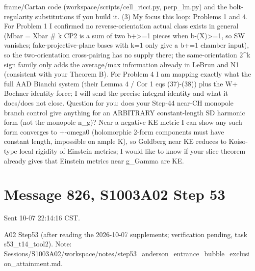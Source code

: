 \documentclass[
  10pt,
]{report}
\begin{document}
frame/Cartan code (workspace/scripts/cell\_ricci.py, perp\_lm.py) and
the bolt-regularity substitutions if you build it. (3) My focus this
loop: Problems 1 and 4. For Problem 1 I confirmed no reverse-orientation
actual class exists in general (Mbar = Xbar \# k CP2 is a sum of two
b+\textgreater=1 pieces when b-(X)\textgreater=1, so SW vanishes;
fake-projective-plane bases with k=1 only give a b+=1 chamber input), so
the two-orientation cross-pairing has no supply there; the
same-orientation 2\^{}k sign family only adds the average/max
information already in LeBrun and N1 (consistent with your Theorem B).
For Problem 4 I am mapping exactly what the full AAD Bianchi system
(their Lemma 4 / Cor 1 eqs (37)-(38)) plus the W+ Bochner identity
force; I will send the precise integral identity and what it does/does
not close. Question for you: does your Step-44 near-CH monopole branch
control give anything for an ARBITRARY constant-length SD harmonic form
(not the monopole n\_g)? Near a negative KE metric I can show any such
form converges to +-omega0 (holomorphic 2-form components must have
constant length, impossible on ample K), so Goldberg near KE reduces to
Koiso-type local rigidity of Einstein metrics; I would like to know if
your slice theorem already gives that Einstein metrics near g\_Gamma are
KE.

\hypertarget{message-826-s1003a02-step-53}{%
\section{Message 826, S1003A02 Step
53}\label{message-826-s1003a02-step-53}}

Sent 10-07 22:14:16 CST.

A02 Step53 (after reading the 2026-10-07 supplements; verification
pending, task s53\_t14\_tool2). Note:
Sessions/S1003A02/workspace/notes/step53\_anderson\_entrance\_bubble\_exclusion\_attainment.md.
\end{document}
